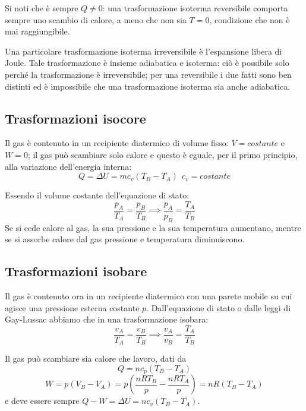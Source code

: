 \documentclass[class=book, crop=false, oneside, 12pt]{standalone}
\begin{document}
Si noti che è sempre \(Q \neq 0\): una trasformazione isoterma reversibile comporta sempre uno scambio di calore, a meno che non sia \(T = 0\), condizione che non è mai raggiungibile. 

Una particolare trasformazione isoterma irreversibile è l'espansione libera di Joule. 
Tale trasformazione è insieme adiabatica e isoterma: ciò è possibile solo perché la trasformazione è irreversibile; per una reversibile i due fatti sono ben distinti ed è impossibile che una trasformazione isoterma sia anche adiabatica.

\subsection{Trasformazioni isocore}

Il gas è contenuto in un recipiente diatermico di volume fisso: \(V = costante\) e \(W = 0\); il gas può scambiare solo calore e questo è eguale, per il primo principio, alla variazione dell'energia interna:
\begin{equation*}
    Q = \Delta U = m c_v (T_B - T_A) \ \  c_v = costante
\end{equation*}

Essendo il volume costante dell'equazione di stato:
\begin{equation*}
    \frac{p_A}{T_A} = \frac{p_B}{T_B} \implies \frac{p_A}{p_B} = \frac{T_A}{T_B}
\end{equation*}
Se si cede calore al gas, la sua pressione e la sua temperatura aumentano, mentre se si assorbe calore dal gas pressione e temperatura diminuiscono.

\subsection{Trasformazioni isobare}

Il gas è contenuto ora in un recipiente diatermico con una parete mobile su cui agisce una pressione esterna costante \(p\).
Dall'equazione di stato o dalle leggi di Gay-Lussac abbiamo che in una trasformazione isobara:
\begin{equation*}
    \frac{v_A}{T_A} = \frac{v_B}{T_B} \implies \frac{v_A}{v_B} = \frac{T_A}{T_B}
\end{equation*}

Il gas può scambiare sia calore che lavoro, dati da 
\begin{equation*}
    Q = n c_p \left(T_B - T_A\right)
\end{equation*}
\begin{equation*}
    W = p (V_B - V_A) = p \left(\frac{n R T_B}{p} - \frac{n R T_A}{p}\right) = n R \left(T_B - T_A\right) 
\end{equation*}
e deve essere sempre \(Q - W = \Delta U = n c_v (T_B - T_A)\).
\end{document}
